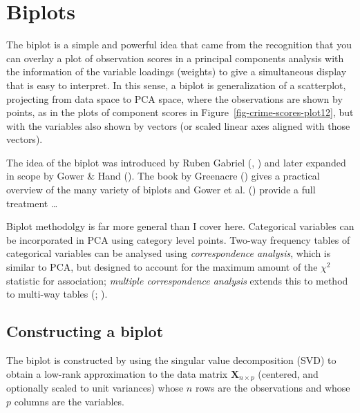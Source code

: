 \documentclass[
  letterpaper,
  10pt,
  krantz2]{krantz}
\begin{document}
{\section{Biplots}\label{sec-biplot}

The biplot is a simple and powerful idea that came from the recognition
that you can overlay a plot of observation scores in a principal
components analysis with the information of the variable loadings
(weights) to give a simultaneous display that is easy to interpret. In
this sense, a biplot is generalization of a scatterplot, projecting from
data space to PCA space, where the observations are shown by points, as
in the plots of component scores in
Figure~\ref{fig-crime-scores-plot12}, but with the variables also shown
by vectors (or scaled linear axes aligned with those vectors).

The idea of the biplot was introduced by Ruben Gabriel
(, ) and
later expanded in scope by Gower \& Hand
(). The book by Greenacre
() gives a practical overview
of the many variety of biplots and Gower et al.
() provide a full treatment \ldots{}

Biplot methodolgy is far more general than I cover here. Categorical
variables can be incorporated in PCA using category level points.
Two-way frequency tables of categorical variables can be analysed using
\emph{correspondence analysis}, which is similar to PCA, but designed to
account for the maximum amount of the \(\chi^2\) statistic for
association; \emph{multiple correspondence analysis} extends this to
method to multi-way tables
(;
).

\subsection{Constructing a biplot}\label{constructing-a-biplot}

The biplot is constructed by using the singular value decomposition
(SVD) to obtain a low-rank approximation to the data matrix
\(\mathbf{X}_{n \times p}\) (centered, and optionally scaled to unit
variances) whose \(n\) rows are the observations and whose \(p\) columns
are the variables.

\begin{figure}


\end{figure}}
\end{document}
